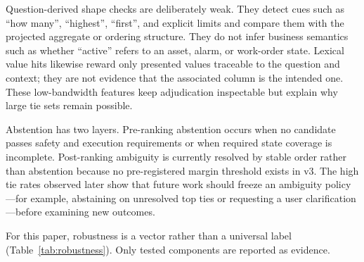 \documentclass[applsci,article,submit,moreauthors]{Definitions/mdpi}
\begin{document}
Question-derived shape checks are deliberately weak. They detect cues such as ``how many'', ``highest'', ``first'', and explicit limits and compare them with the projected aggregate or ordering structure. They do not infer business semantics such as whether ``active'' refers to an asset, alarm, or work-order state. Lexical value hits likewise reward only presented values traceable to the question and context; they are not evidence that the associated column is the intended one. These low-bandwidth features keep adjudication inspectable but explain why large tie sets remain possible.

Abstention has two layers. Pre-ranking abstention occurs when no candidate passes safety and execution requirements or when required state coverage is incomplete. Post-ranking ambiguity is currently resolved by stable order rather than abstention because no pre-registered margin threshold exists in v3. The high tie rates observed later show that future work should freeze an ambiguity policy---for example, abstaining on unresolved top ties or requesting a user clarification---before examining new outcomes.

For this paper, robustness is a vector rather than a universal label (Table~\ref{tab:robustness}). Only tested components are reported as evidence.

\begin{table}[htbp]
\caption{Operational robustness dimensions and their evidence boundaries.}
\label{tab:robustness}
\centering
\small
{}
\end{table}
\end{document}
